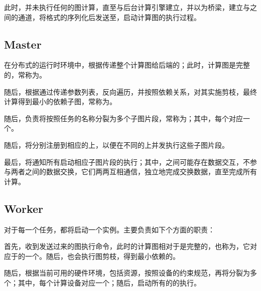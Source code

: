\begin{content}
此时，并未执行任何的图计算，直至与后台计算引擎建立，并以为桥梁，建立与之间的通道，将格式的序列化后发送至，启动计算图的执行过程。

\subsection{Master}

在分布式的运行时环境中，根据传递整个计算图给后端的；此时，计算图是完整的，常称为\emph{}。

随后，根据通过传递参数列表，反向遍历，并按照依赖关系，对其实施剪枝，最终计算得到最小的依赖子图，常称为。

随后，负责将按照任务的名称分裂为多个子图片段，常称为；其中，每个对应一个。

随后，将分别注册到相应的上，以便在不同的上并发执行这些子图片段。

最后，将通知所有启动相应子图片段的执行；其中，之间可能存在数据交互，不参与两者之间的数据交换，它们两两互相通信，独立地完成交换数据，直至完成所有计算。

\subsection{Worker}

对于每一个任务，\tf{}都将启动一个实例。主要负责如下个方面的职责：

\begin{enum}
\end{enum}

首先，收到发送过来的图执行命令，此时的计算图相对于是完整的，也称为，它对应于的一个。随后，也会执行图剪枝，得到最小依赖的。

随后，根据当前可用的硬件环境，包括资源，按照设备的约束规范，再将分裂为多个；其中，每个计算设备对应一个；随后，启动所有的的执行。


\end{content}

